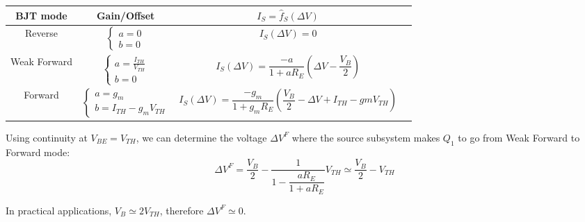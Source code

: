 \documentclass[10pt]{article}
\begin{document}
\begin{table}[h]
	\centering
	\begin{tabular}{|c||c|c|c|}
		\hline
		\textbf{BJT mode} & \textbf{Gain/Offset} & $I_S = \hat{f}_S (\Delta V)$ \\ \hline

		Reverse 
		& 
		$\left\{
		\begin{array}{ll}
			a = 0 \\
			b = 0
		\end{array}
		\right.$
		& 
		$I_S(\Delta V) = 0$	\\ \hline

		Weak Forward
		& 
		$\left\{
		\begin{array}{ll}
			a = \frac{I_{TH}}{V_{TH}} \\
			b = 0
		\end{array}
		\right.$
		& 
		$I_S(\Delta V) = \dfrac{-a}{1+aR_E} \left( \Delta V-\dfrac{V_B}{2} \right)$	\\ \hline

		Forward
		& 
		$\left\{
		\begin{array}{ll}
			a = g_m \\
			b = I_{TH}-g_m V_{TH}
		\end{array}
		\right.$ 
		&
		$I_S(\Delta V) = \dfrac{-g_m}{1+g_mR_E} \left(\dfrac{V_B}{2} - \Delta V + I_{TH} - gmV_{TH} \right) $\\ \hline
	\end{tabular}
\end{table}

Using continuity at $V_{BE} = V_{TH}$, we can determine the voltage $\Delta V^F$ where the source subsystem makes $Q_1$ to go from Weak Forward to Forward mode:
$$
	\Delta V^F = \dfrac{V_B}{2} - \dfrac{1}{1-\dfrac{aR_E}{1+aR_E}} V_{TH} \simeq \dfrac{V_B}{2} - V_{TH}
$$

In practical applications, $V_B \simeq 2 V_{TH}$, therefore $\Delta V^F \simeq 0$.
\end{document}
